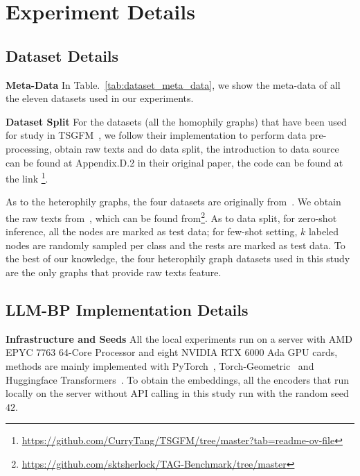 \section{Experiment Details}

\subsection{Dataset Details}
\label{sec:app_datasets}
\textbf{Meta-Data}
In Table.~\ref{tab:dataset_meta_data}, we show the meta-data of all the eleven datasets used in our experiments.




\textbf{Dataset Split} For the datasets (all the homophily graphs) that have been used for study in TSGFM~\cite{chen2024text}, we follow their implementation to perform data pre-processing, obtain raw texts and do data split, the introduction to data source can be found at Appendix.D.2 in their original paper, the code can be found at the link \footnote{\url{https://github.com/CurryTang/TSGFM/tree/master?tab=readme-ov-file}}.

As to the heterophily graphs, the four datasets are originally from~\cite{craven1998learning}. We obtain the raw texts from~\cite{yan2023comprehensive}, which can be found from\footnote{\url{https://github.com/sktsherlock/TAG-Benchmark/tree/master}}. As to data split, for zero-shot inference, all the nodes are marked as test data; for few-shot setting, $k$ labeled nodes are randomly sampled per class and the rests are marked as test data.
To the best of our knowledge, the four heterophily graph datasets used in this study are the only graphs that provide raw texts feature.





\subsection{LLM-BP Implementation Details}
\label{sec:app_llm_bp_implementation_details}
\textbf{Infrastructure and Seeds}
All the local experiments run on a server with AMD EPYC 7763 64-Core Processor and eight NVIDIA RTX 6000 Ada GPU cards, methods are mainly implemented with PyTorch~\cite{paszke2019pytorch}, Torch-Geometric~\cite{fey2019fast} and Huggingface Transformers~\cite{wolf2019huggingface}.
To obtain the embeddings, all the encoders that run locally on the server without API calling in this study run with the random seed $42$.


